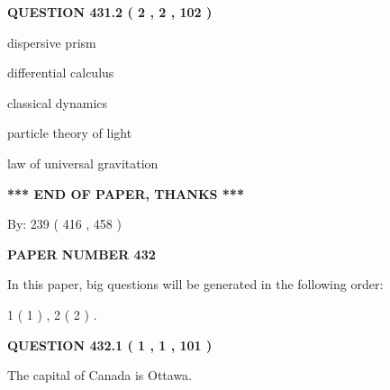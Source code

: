 \documentclass[12pt]{article}
\begin{document}
{\textbf{\Large{QUESTION
431.2 
 ( 2 , 2 , 102 )
}}}
  
  
 
 
\noindent{}
 
 
dispersive prism
 
 
differential calculus
 
 
classical dynamics
 
 
particle theory of light
 
 
law of universal gravitation
 
 
 
 
   
   
\vspace{1.0in} 
{\textbf{\large{ *** END OF PAPER, THANKS *** }}} 
   
   
\hspace{1.0in} By: 
 239 ( 416 ,  458 )
   
   
   
   
\newpage 
\setcounter{page}{ 
   432001 } 
   
   
   
   
 {\textbf{ \Large{ PAPER NUMBER  432  }}}
   
   
\vspace{0.2in}
   
   
   
   
   
\vspace{0.2in}
   
In this paper, big questions will be generated in the following order: 
   
   
   1 ( 1 )
 ,
   2 ( 2 )
 .
  
\vspace{0.2in}
  
{\textbf{\Large{QUESTION
432.1 
 ( 1 , 1 , 101 )
}}}
  
  
 
 
\noindent{}
 
 
The capital of Canada is Ottawa.
 
 
 
\end{document}
